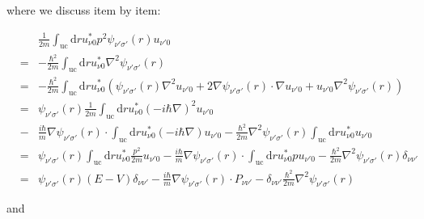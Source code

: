 \documentclass{article}
\begin{document}
where we discuss item by item:

\begin{eqnarray*}  &  & \frac{1}{2 m} \int_{\text{uc}} \text{d} r u^{\ast}_{\nu 0} p^2  \psi_{\nu' \sigma'} (r) u_{\nu' 0}\\  & = & - \frac{\hbar^2}{2 m} \int_{\text{uc}} \text{d} r u^{\ast}_{\nu 0}  \nabla^2 \psi_{\nu' \sigma'} (r)\\  & = & - \frac{\hbar^2}{2 m} \int_{\text{uc}} \text{d} r u^{\ast}_{\nu 0}  (\psi_{\nu' \sigma'} (r) \nabla^2 u_{\nu' 0} + 2 \nabla \psi_{\nu' \sigma'}  (r) \cdot \nabla u_{\nu' 0} + u_{\nu' 0} \nabla^2 \psi_{\nu' \sigma'} (r))\\  & = & \psi_{\nu' \sigma'} (r) \frac{1}{2 m} \int_{\text{uc}} \text{d} r  u^{\ast}_{\nu 0} (- i \hbar \nabla)^2 u_{\nu' 0}\\  & - & \frac{i \hbar}{m} \nabla \psi_{\nu' \sigma'} (r) \cdot  \int_{\text{uc}} \text{d} r u^{\ast}_{\nu 0} (- i \hbar \nabla) u_{\nu' 0} -  \frac{\hbar^2}{2 m} \nabla^2 \psi_{\nu' \sigma'} (r) \int_{\text{uc}}  \text{d} r u^{\ast}_{\nu 0} u_{\nu' 0}\\  & = & \psi_{\nu' \sigma'} (r) \int_{\text{uc}} \text{d} r u^{\ast}_{\nu 0}  \frac{p^2}{2 m} u_{\nu' 0} - \frac{i \hbar}{m} \nabla \psi_{\nu' \sigma'}  (r) \cdot \int_{\text{uc}} \text{d} r u^{\ast}_{\nu 0} p u_{\nu' 0} -  \frac{\hbar^2}{2 m} \nabla^2 \psi_{\nu' \sigma'} (r) \delta_{\nu \nu'}\\  & = & \psi_{\nu' \sigma'} (r) (E - V) \delta_{\nu \nu'} - \frac{i \hbar}{m}  \nabla \psi_{\nu' \sigma'} (r) \cdot P_{\nu \nu'} - \delta_{\nu \nu'}  \frac{\hbar^2}{2 m} \nabla^2 \psi_{\nu' \sigma'} (r)\end{eqnarray*}

and
\end{document}
